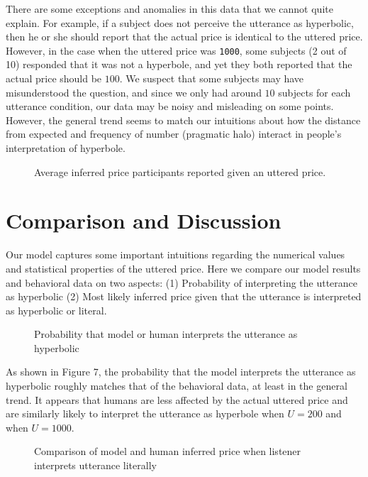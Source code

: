 \documentclass{article} %
\begin{document}
There are some exceptions and anomalies in this data that we cannot quite explain. For example, if a subject does not perceive the utterance as hyperbolic, then he or she should report that the actual price is identical to the uttered price. However, in the case when the uttered price was \texttt{1000}, some subjects (2 out of 10) responded that it was not a hyperbole, and yet they both reported that the actual price should be $100$. We suspect that some subjects may have misunderstood the question, and since we only had around $10$ subjects for each utterance condition, our data may be noisy and misleading on some points. However, the general trend seems to match our intuitions about how the distance from expected and frequency of number (pragmatic halo) interact in people's interpretation of hyperbole.


\begin{figure}[tl]
\caption{Average inferred price participants reported given an uttered price.}
\end{figure}


\section{Comparison and Discussion}
Our model captures some important intuitions regarding the numerical values and statistical properties of the uttered price. Here we compare our model results and behavioral data on two aspects: (1) Probability of interpreting the utterance as hyperbolic (2) Most likely inferred price given that the utterance is interpreted as hyperbolic or literal.

\begin{figure}[tl]
\caption{Probability that model or human interprets the utterance as hyperbolic}
\end{figure}

As shown in Figure 7, the probability that the model interprets the utterance as hyperbolic roughly matches that of the behavioral data, at least in the general trend. It appears that humans are less affected by the actual uttered price and are similarly likely to interpret the utterance as hyperbole when $U = 200$ and when $U = 1000$.

\begin{figure}[tl]
\caption{Comparison of model and human inferred price when listener interprets utterance literally}
\end{figure}
\end{document}
